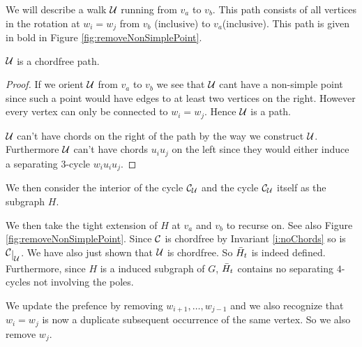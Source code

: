     We will describe a walk $\mathcal{U}$ running from $v_a$ to $v_b$. This path consists of all vertices in the rotation at $w_i=w_j$ from $v_b$ (inclusive) to $v_a$(inclusive). This path is given in bold in Figure \ref{fig:removeNonSimplePoint}.

    \begin{lemma}
    $\mathcal{U}$ is a chordfree path.
    \end{lemma}
    \begin{proof}
      If we orient $\mathcal{U}$ from $v_a$ to $v_b$  we see that $\mathcal{U}$ cant have a non-simple point since such a point would have edges to at least two vertices on the right. However every vertex can only be connected to $w_i=w_j$. Hence $\mathcal{U}$ is a path.

      $\mathcal{U}$ can't have chords on the right of the path by the way we construct $\mathcal{U}$. Furthermore $\mathcal{U}$ can't have chords $u_i u_j$ on the left since they would either induce a separating $3$-cycle $w_i u_i u_j$.
    \end{proof}


    We then consider the interior of the cycle $\mathcal{C}_{\mathcal{U}}$ and the cycle $\mathcal{C}_{\mathcal{U}}$ itself as the subgraph $H$.

    We then take the tight extension of $H$ at $v_a$ and $v_b$ to recurse on. See also Figure \ref{fig:removeNonSimplePoint}. Since $\mathcal{C}$ is chordfree by Invariant \ref{i:noChords} so is $\restC{\U}$. We have also just shown that $\mathcal{U}$ is chordfree. So $\bar{H}_t$ is indeed defined. Furthermore, since $H$ is a induced subgraph of $G$, $\bar{H}_t$ contains no separating $4$-cycles not involving the poles.

     We update the prefence by removing $w_{i+1}, \ldots, w_{j-1}$ and we also recognize that $w_i = w_j$ is now a duplicate subsequent occurrence of the same vertex. So we also remove $w_j$.

